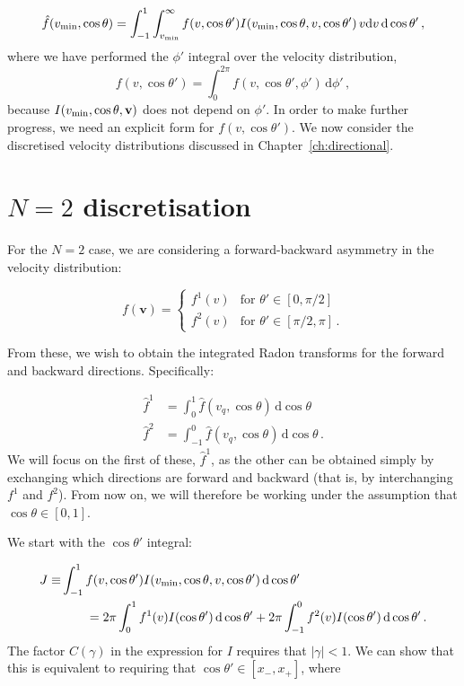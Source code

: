 \begin{equation}
\hat{f}(\vmin, \cos\theta) = \int_{-1}^{1} \int_{\vmin}^{\infty}  f(v, \cos\theta') I(\vmin, \cos\theta, v, \cos\theta')\, v \mathrm{d}v\, \mathrm{d}\cos\theta'\,,
\end{equation}
where we have performed the $\phi'$ integral over the velocity distribution,
\begin{equation}
f(v, \cos\theta') = \int_{0}^{2\pi} f(v, \cos\theta', \phi') \, \mathrm{d}\phi'\,,
\end{equation}
because $I(\vmin, \cos\theta, \mathbf{v})$ does not depend on $\phi'$. In order to make further progress, we need an explicit form for $f(v, \cos\theta')$. We now consider the discretised velocity distributions discussed in Chapter~\ref{ch:directional}.


\section{$N=2$ discretisation}

For the $N=2$ case, we are considering a forward-backward asymmetry in the velocity distribution:

\begin{equation}
\label{eq:RadonCalc:N2}
f(\mathbf{v}) =
\begin{cases}
f^1(v) & \textrm{for } \theta' \in [0, \pi/2] \\
f^2(v) & \textrm{for } \theta' \in [\pi/2, \pi]\,.
\end{cases}
\end{equation}

From these, we wish to obtain the integrated Radon transforms for the forward and backward directions. Specifically:

\begin{align}
\hat{f}^1 &= \int_{0}^1 \hat{f}(v_q,\cos\theta) \, \mathrm{d}\cos\theta \\
\hat{f}^2 &= \int_{-1}^0 \hat{f}(v_q, \cos\theta) \, \mathrm{d}\cos\theta \,.
\end{align}
We will focus on the first of these, $\hat{f}^1$, as the other can be obtained simply by exchanging which directions are forward and backward (that is, by interchanging $f^1$ and $f^2$). From now on, we will therefore be working under the assumption that $\cos\theta \in [0,1]$.

We start with the $\cos\theta'$ integral:

\begin{align}
\label{eq:RadonCalc:J}
J \equiv &\int_{-1}^{1} f(v, \cos\theta')I(\vmin, \cos\theta, v, \cos\theta') \, \mathrm{d}\cos\theta' \nonumber\\
&\qquad = 2\pi\int_0^1 f^1(v) I(\cos\theta') \, \mathrm{d}\cos\theta' + 2\pi\int_{-1}^0 f^2(v) I(\cos\theta') \, \mathrm{d}\cos\theta'\,.
\end{align}
The factor $C(\gamma)$ in the expression for $I$ requires that $|\gamma| < 1$. We can show that this is equivalent to requiring that $\cos\theta' \in [x_-, x_+]$, where

